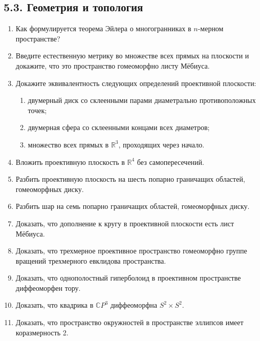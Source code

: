 	\subsection{5.3. Геометрия и топология}
	\begin{enumerate}

		\item Как формулируется теорема Эйлера о многогранниках в $n$-мерном пространстве?

		\item Введите естественную метрику во множестве всех прямых на плоскости и докажите, что это пространство гомеоморфно листу Мёбиуса.

		\item Докажите эквивалентность следующих определений проективной плоскости:
		\begin{enumerate}
			\item двумерный диск со склеенными парами диаметрально противоположных точек;
			\item двумерная сфера со склеенными концами всех диаметров;
			\item множество всех прямых в $\mathbb{R}^3$, проходящих через начало.
		\end{enumerate}

		\item Вложить проективную плоскость в $\mathbb{R}^4$ без самопересечений.

		\item Разбить проективную плоскость на шесть попарно граничащих областей, гомеоморфных диску.

		\item Разбить шар на семь попарно граничащих областей, гомеоморфных диску.

		\item Доказать, что дополнение к кругу в проективной плоскости есть лист Мёбиуса.

		\item Доказать, что трехмерное проективное пространство гомеоморфно группе вращений трехмерного евклидова пространства.

		\item Доказать, что однополостный гиперболоид в проективном пространстве диффеоморфен тору.

		\item Доказать, что квадрика в $\mathbb{C}P^3$ диффеоморфна $S^2 \times S^2$.

		\item Доказать, что пространство окружностей в пространстве эллипсов имеет коразмерность 2.
	\end{enumerate}
% 
